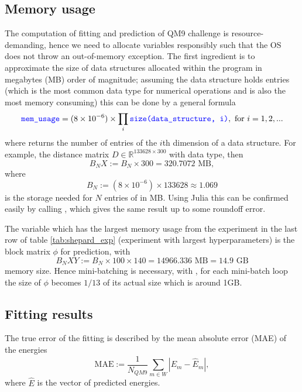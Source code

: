 \documentclass[12pt]{article}
\begin{document}
\subsection{Memory usage}
The computation of fitting and prediction of QM9 challenge is resource-demanding, hence we need to allocate variables responsibly such that the OS does not throw an out-of-memory exception. The first ingredient is to approximate the size of data structures allocated within the program in megabytes (MB) order of magnitude; assuming the data structure holds  entries (which is the most common data type for numerical operations and is also the most memory consuming) this can be done by a general formula
\begin{equation}
	\codeword{mem_usage} = (8\times 10^{-6}) \times \prod_{i}\codeword{size(data_structure, i)}, \text{ for } i = 1,2,...
\end{equation}
where  returns the number of entries of the $i$th dimension of a data structure. For example, the distance matrix $D \in \mathbb{R}^{133628 \times 300}$ with  data type, then
\begin{equation}
	B_NX := B_N \times 300 = 320.7072 \text{ MB},
\end{equation}
where
\begin{equation}
	B_N := (8\times 10^{-6}) \times 133628 \approx 1.069
\end{equation}
is the storage needed for $N$ entries of  in MB.
Using Julia this can be confirmed easily by calling , which gives the same result up to some roundoff error.

The variable which has the largest memory usage from the experiment in the last row of table \ref{tab:shepard_exp} (experiment with largest hyperparameters)  is the block matrix $\phi$  for prediction, with
\begin{equation}
	B_NXY := B_N \times 100 \times 140 = 14966.336 \text{ MB} = 14.9 \text{ GB}
\end{equation}
memory size. Hence mini-batching is necessary, with , for each mini-batch loop the size of $\phi$ becomes $1/13$ of its actual size which is around 1GB. 


\subsection{Fitting results}
\label{subsec:fitting}
The true error of the fitting is described by the mean absolute error (MAE) of the energies
\begin{equation}
	\text{MAE} := \frac{1}{N_{QM9}}\sum_{m \in W}|E_{m} - \hat{E}_m|,
\end{equation}
where $\hat{E}$ is the vector of predicted energies.
\end{document}
